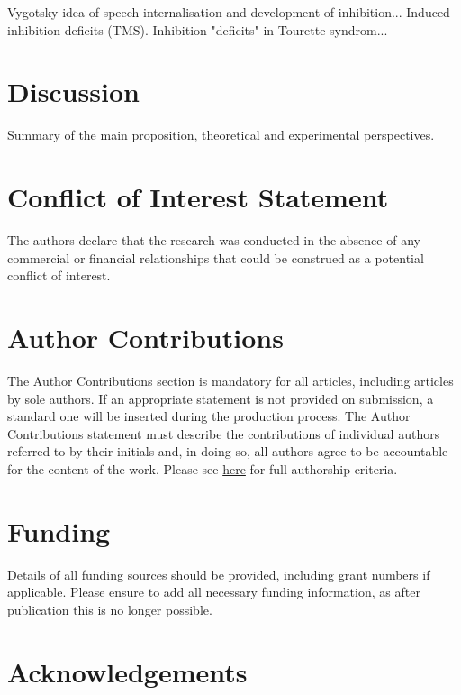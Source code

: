 \documentclass[utf8]{frontiersSCNS} %
\begin{document}
Vygotsky idea of speech internalisation and development of inhibition... Induced inhibition deficits (TMS). Inhibition "deficits" in Tourette syndrom...

\section{Discussion}

Summary of the main proposition, theoretical and experimental perspectives.

\section*{Conflict of Interest Statement}


The authors declare that the research was conducted in the absence of any commercial or financial relationships that could be construed as a potential conflict of interest.

\section*{Author Contributions}

The Author Contributions section is mandatory for all articles, including articles by sole authors. If an appropriate statement is not provided on submission, a standard one will be inserted during the production process. The Author Contributions statement must describe the contributions of individual authors referred to by their initials and, in doing so, all authors agree to be accountable for the content of the work. Please see  \href{http://home.frontiersin.org/about/author-guidelines#AuthorandContributors}{here} for full authorship criteria.

\section*{Funding}

Details of all funding sources should be provided, including grant numbers if applicable. Please ensure to add all necessary funding information, as after publication this is no longer possible.

\section*{Acknowledgements}
\end{document}

